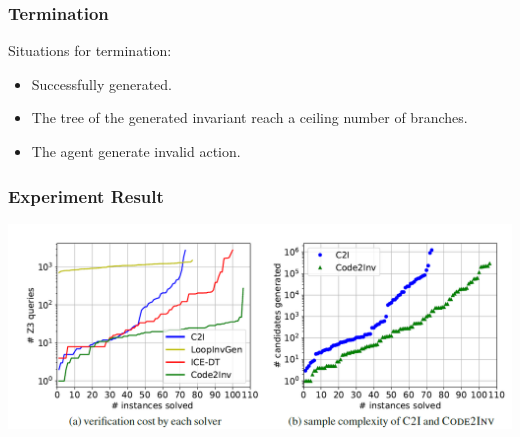 \documentclass[11pt]{beamer}
\begin{document}
\begin{frame}\frametitle{Termination}
Situations for termination:
\begin{itemize}
\item Successfully generated.
\item The tree of the generated invariant reach a ceiling number of branches.
\item The agent generate invalid action.

\end{itemize}

\end{frame}
\begin{frame}\frametitle{Experiment Result}

\begin{center}

\includegraphics[scale = 0.35]{10.png}
\end{center}

\end{frame}
\end{document}
